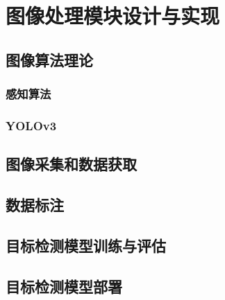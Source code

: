 %

%

\chapter{图像处理模块设计与实现}


\section{图像算法理论}

\subsection{感知算法}

\subsection{YOLOv3}

\section{图像采集和数据获取}

\section{数据标注}

\section{目标检测模型训练与评估}

\section{目标检测模型部署}


